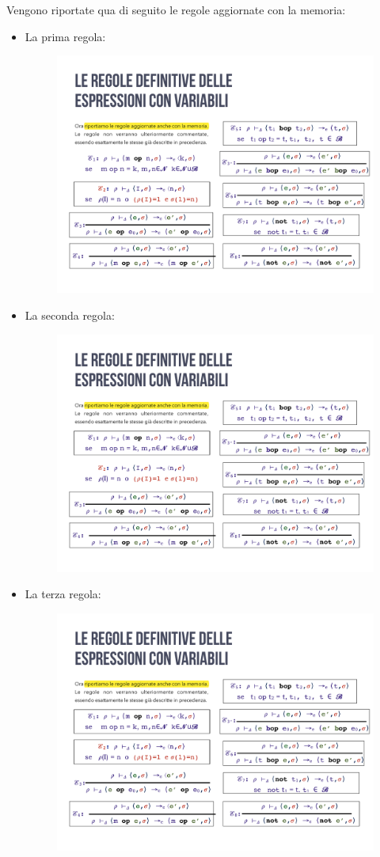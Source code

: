 \documentclass[a4paper]{article}
\begin{document}
 	Vengono riportate qua di seguito le regole aggiornate con la memoria:
 	\begin{itemize}
 		\item La prima regola:
 		\begin{figure}[!htp]
 			\centering
 			\includegraphics[width=.7\textwidth]{img/regola_espressione-up-1.pdf}
 		\end{figure}
 		
 		\item La seconda regola:
 		\begin{figure}[!htp]
 			\centering
 			\includegraphics[width=.7\textwidth]{img/regola_espressione-up-2.pdf}
 		\end{figure}
 		
 		\item La terza regola:
 		\begin{figure}[!htp]
 			\centering
 			\includegraphics[width=.7\textwidth]{img/regola_espressione-up-3.pdf}
 		\end{figure}
 		

\end{itemize}
\end{document}
